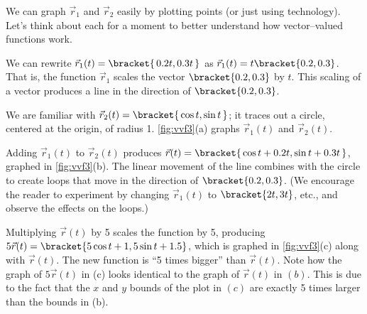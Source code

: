 {We can graph $\vec r_1$ and $\vec r_2$ easily by plotting points (or just using technology). Let's think about each for a moment to better understand how vector--valued functions work.

We can rewrite $\vec r_1(t) =\bracket{\, 0.2t,0.3t\,}$ as $ \vec r_1(t) = t\bracket{0.2,0.3}$. That is, the function $\vec r_1$ scales the vector $\bracket{0.2,0.3}$ by $t$. This scaling of a vector produces a line in the direction of $\bracket{0.2,0.3}$.

We are familiar with $\vec r_2(t) =\bracket{\, \cos t,\sin t\,}$; it traces out a circle, centered at the origin, of radius 1. \autoref{fig:vvf3}(a) graphs $\vec r_1(t)$ and $\vec r_2(t)$.

Adding $\vec r_1(t)$ to $\vec r_2(t)$ produces $\vec r(t) =\bracket{\,\cos t + 0.2t,\sin t+0.3t\,}$, graphed in \autoref{fig:vvf3}(b). The linear movement of the line combines with the circle to create loops that move in the direction of $\bracket{0.2,0.3}$.  (We encourage the reader to experiment by changing $\vec r_1(t)$ to $\bracket{2t,3t}$, etc., and observe the effects on the loops.)

Multiplying $\vec r(t)$ by 5 scales the function by 5, producing $5\vec r(t) =\bracket{5\cos t+1,5\sin t+1.5}$, which is graphed in \autoref{fig:vvf3}(c) along with $\vec r(t)$. The new function is ``5 times bigger'' than $\vec r(t)$. Note how the graph of $5\vec r(t)$ in (c) looks identical to the graph of $\vec r(t)$ in $(b)$. This is due to the fact that the $x$ and $y$ bounds of the plot in $(c)$ are exactly 5 times larger than the bounds in (b).}

